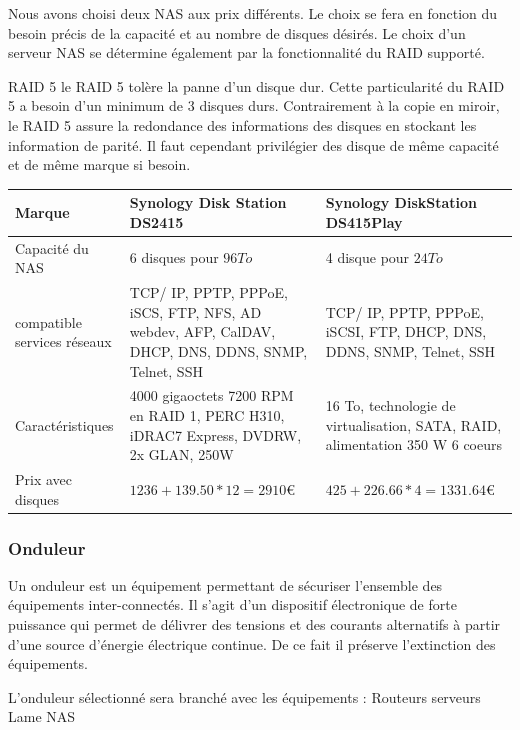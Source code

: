 Nous avons choisi deux NAS aux prix différents. Le choix se fera en fonction du besoin précis de la capacité et au nombre de disques désirés.
Le choix d'un serveur NAS se détermine également par la fonctionnalité du RAID supporté.

RAID 5
le RAID 5 tolère la panne d'un disque dur. Cette particularité du RAID 5 a besoin d'un minimum de 3 disques durs. Contrairement à la copie en miroir, le RAID 5 assure la redondance des informations des disques en stockant les information de parité. Il faut cependant privilégier des disque de même capacité et de même marque si besoin.


    \begin{center}
        \begin{tabular}{|l|p{5cm}|p{5cm}|}
          \hline
            Marque  &
Synology Disk Station DS2415
    &   Synology DiskStation DS415Play
 \\
          \hline
Capacité du NAS
  &
6 disques pour $96To$
    &
4 disque pour $24To$
 \\
          \hline
compatible services réseaux
  &
TCP/ IP, PPTP, PPPoE, iSCS, FTP, NFS, AD webdev, AFP, CalDAV, DHCP, DNS, DDNS, SNMP, Telnet, SSH
    &
TCP/ IP, PPTP, PPPoE, iSCSI, FTP, DHCP, DNS, DDNS, SNMP, Telnet, SSH
 \\
          \hline
            Caractéristiques  &
4000 gigaoctets 7200 RPM en RAID 1, PERC H310, iDRAC7 Express, DVDRW, 2x GLAN, 250W
                & 16 To, technologie de virtualisation, SATA, RAID, alimentation 350 W
6 coeurs
                  \\
        \hline
            Prix avec disques &
$1236 + 139.50 * 12 = 2910 \euro   $
    &
$425 + 226.66 * 4 = 1331.64 \euro   $
 \\
          \hline
        \end{tabular}
    \end{center}


\subsubsection{Onduleur}

Un onduleur est un équipement permettant de sécuriser l'ensemble des équipements inter-connectés. Il s'agit d'un dispositif électronique de forte puissance qui permet de délivrer des tensions et des courants alternatifs à partir d'une source d'énergie électrique continue. De ce fait il préserve l'extinction des équipements.

L'onduleur sélectionné sera branché avec les équipements :
Routeurs
serveurs Lame
NAS

